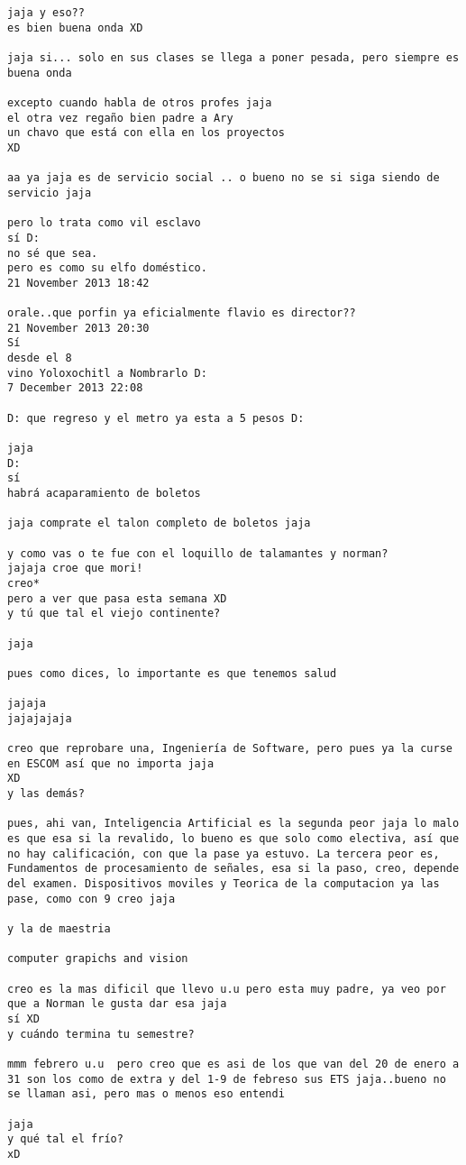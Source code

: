 \begin{verbatim}
jaja y eso??
es bien buena onda XD

jaja si... solo en sus clases se llega a poner pesada, pero siempre es buena onda

excepto cuando habla de otros profes jaja
el otra vez regaño bien padre a Ary
un chavo que está con ella en los proyectos
XD

aa ya jaja es de servicio social .. o bueno no se si siga siendo de servicio jaja

pero lo trata como vil esclavo
sí D:
no sé que sea.
pero es como su elfo doméstico.
21 November 2013 18:42

orale..que porfin ya eficialmente flavio es director??
21 November 2013 20:30
Sí
desde el 8
vino Yoloxochitl a Nombrarlo D:
7 December 2013 22:08

D: que regreso y el metro ya esta a 5 pesos D:

jaja
D:
sí
habrá acaparamiento de boletos

jaja comprate el talon completo de boletos jaja

y como vas o te fue con el loquillo de talamantes y norman?
jajaja croe que mori!
creo*
pero a ver que pasa esta semana XD
y tú que tal el viejo continente?

jaja

pues como dices, lo importante es que tenemos salud

jajaja
jajajajaja

creo que reprobare una, Ingeniería de Software, pero pues ya la curse en ESCOM así que no importa jaja
XD
y las demás?

pues, ahi van, Inteligencia Artificial es la segunda peor jaja lo malo es que esa si la revalido, lo bueno es que solo como electiva, así que no hay calificación, con que la pase ya estuvo. La tercera peor es, Fundamentos de procesamiento de señales, esa si la paso, creo, depende del examen. Dispositivos moviles y Teorica de la computacion ya las pase, como con 9 creo jaja

y la de maestria

computer grapichs and vision

creo es la mas dificil que llevo u.u pero esta muy padre, ya veo por que a Norman le gusta dar esa jaja
sí XD
y cuándo termina tu semestre?

mmm febrero u.u  pero creo que es asi de los que van del 20 de enero a 31 son los como de extra y del 1-9 de febreso sus ETS jaja..bueno no se llaman asi, pero mas o menos eso entendi

jaja
y qué tal el frío?
xD


\end{verbatim}
